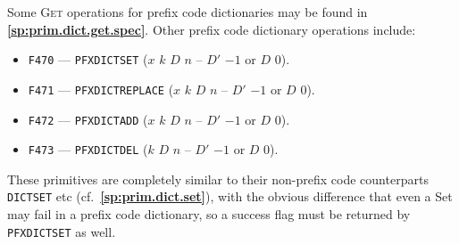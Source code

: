 \documentclass[12pt,oneside]{article}
\def\refpoint#1{{\rm\textbf{\ref{#1}}}}
\let\ptref=\refpoint
\begin{document}
Some \textsc{Get} operations for prefix code dictionaries may be found in \ptref{sp:prim.dict.get.spec}. Other prefix code dictionary operations include:
\begin{itemize}
\item {\tt F470} --- {\tt PFXDICTSET} ($x$ $k$ $D$ $n$ -- $D'$ $-1$ or $D$ $0$).
\item {\tt F471} --- {\tt PFXDICTREPLACE} ($x$ $k$ $D$ $n$ -- $D'$ $-1$ or $D$ $0$).
\item {\tt F472} --- {\tt PFXDICTADD} ($x$ $k$ $D$ $n$ -- $D'$ $-1$ or $D$ $0$).
\item {\tt F473} --- {\tt PFXDICTDEL} ($k$ $D$ $n$ -- $D'$ $-1$ or $D$ $0$).
\end{itemize}
These primitives are completely similar to their non-prefix code counterparts {\tt DICTSET} etc (cf.~\ptref{sp:prim.dict.set}), with the obvious difference that even a {\sc Set} may fail in a prefix code dictionary, so a success flag must be returned by {\tt PFXDICTSET} as well.
\end{document}
